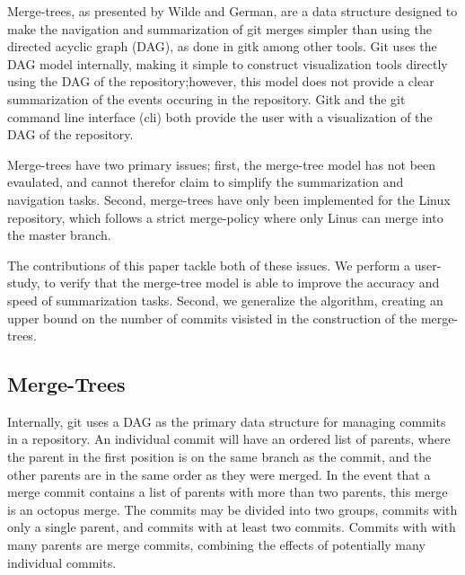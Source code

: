 Merge-trees, as presented by Wilde and German\cite{Wilde2016}, are a
data structure designed to make the navigation and summarization of git
merges simpler than using the directed acyclic graph (DAG), as done in
gitk among other tools. Git uses the
DAG model internally, making it simple to construct visualization tools
directly using the DAG of the repository;\@ however, this model does not
provide a clear summarization of the events occuring in the repository.
Gitk and the git command line interface (cli) both provide the user with
a visualization of the DAG of the repository.

Merge-trees have two primary issues; first, the merge-tree model has not
been evaulated, and cannot therefor claim to simplify the summarization
and navigation tasks. Second, merge-trees have only been implemented for
the Linux repository, which follows a strict merge-policy where only
Linus can merge into the master branch.

The contributions of this paper tackle both of these issues. We perform
a user-study, to verify that the merge-tree model is able to improve the
accuracy and speed of summarization tasks. Second, we generalize the
algorithm, creating an upper bound on the number of commits visisted in
the construction of the merge-trees.

\subsection{Merge-Trees}
\label{sub:merge_trees}

Internally, git uses a DAG as the primary data structure for managing
commits in a repository. An individual commit will have an ordered list
of parents, where the parent in the first position is on the same branch
as the commit, and the other parents are in the same order as they were
merged. In the event that a merge commit contains a list of parents with
more than two parents, this merge is an octopus merge. The commits may
be divided into two groups, commits with only a single parent, and
commits with at least two commits. Commits with with many parents are
merge commits, combining the effects of potentially many individual
commits.

